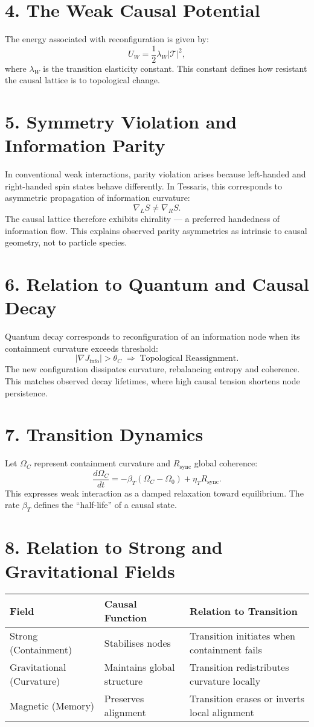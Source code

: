 \documentclass[11pt,a4paper]{article}
\begin{document}
\section{4. The Weak Causal Potential}
The energy associated with reconfiguration is given by:
\[
U_W = \frac{1}{2}\lambda_W |\mathcal{T}|^2,
\]
where $\lambda_W$ is the transition elasticity constant.  
This constant defines how resistant the causal lattice is to topological change.

\section{5. Symmetry Violation and Information Parity}
In conventional weak interactions, parity violation arises because left-handed and right-handed spin states behave differently.  
In Tessaris, this corresponds to asymmetric propagation of information curvature:
\[
\nabla_L S \neq \nabla_R S.
\]
The causal lattice therefore exhibits chirality — a preferred handedness of information flow.  
This explains observed parity asymmetries as intrinsic to causal geometry, not to particle species.

\section{6. Relation to Quantum and Causal Decay}
Quantum decay corresponds to reconfiguration of an information node when its containment curvature exceeds threshold:
\[
|\nabla J_{\mathrm{info}}| > \theta_C \;\Rightarrow\; \text{Topological Reassignment}.
\]
The new configuration dissipates curvature, rebalancing entropy and coherence.  
This matches observed decay lifetimes, where high causal tension shortens node persistence.

\section{7. Transition Dynamics}
Let $\Omega_C$ represent containment curvature and $R_{\mathrm{sync}}$ global coherence:
\[
\frac{d\Omega_C}{dt} = -\beta_T (\Omega_C - \Omega_0) + \eta_T R_{\mathrm{sync}}.
\]
This expresses weak interaction as a damped relaxation toward equilibrium.  
The rate $\beta_T$ defines the ``half-life'' of a causal state.

\section{8. Relation to Strong and Gravitational Fields}
\begin{longtable}{|l|l|l|}
\hline
\textbf{Field} & \textbf{Causal Function} & \textbf{Relation to Transition} \\
\hline
Strong (Containment) & Stabilises nodes & Transition initiates when containment fails \\
Gravitational (Curvature) & Maintains global structure & Transition redistributes curvature locally \\
Magnetic (Memory) & Preserves alignment & Transition erases or inverts local alignment \\
\hline
\end{longtable}
\end{document}
